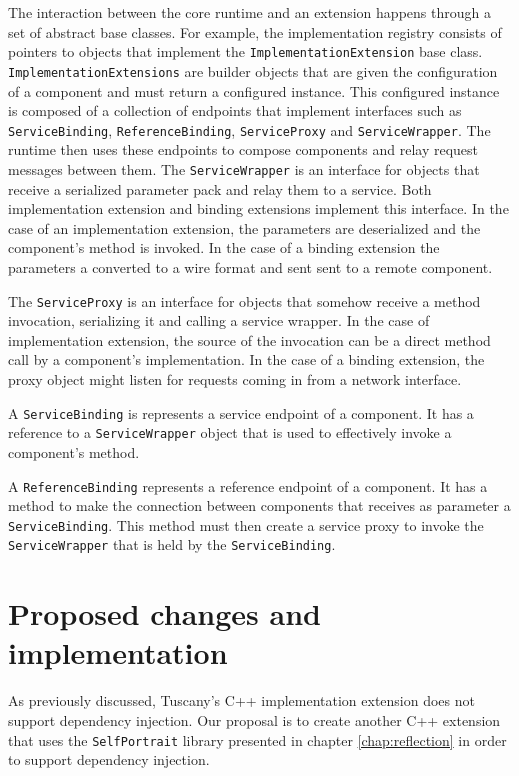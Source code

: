 The interaction between the core runtime and an extension happens through a set of abstract base classes. For example, the
implementation registry consists of pointers to objects that implement the \texttt{ImplementationExtension} base class.
\texttt{ImplementationExtensions} are builder objects that are given the configuration of a component and must return a
configured instance. This configured instance is composed of a collection of endpoints that implement interfaces such as
\texttt{ServiceBinding}, \texttt{ReferenceBinding}, \texttt{ServiceProxy} and \texttt{ServiceWrapper}. The runtime
then uses these endpoints to compose components and relay request messages between them.
The \texttt{ServiceWrapper} is an interface for objects that receive a serialized parameter pack and relay them
to a service. Both implementation extension and binding extensions implement this interface. In the case of an
implementation extension, the parameters are deserialized and the component's method is invoked. In the case
of a binding extension the parameters a converted to a wire format and sent sent to a remote component. 

The \texttt{ServiceProxy} is an interface for objects that somehow receive a method invocation, serializing it and
calling a service wrapper. In the case of implementation extension, the source of the invocation can be a direct method
call by a component's implementation. In the case of a binding extension, the proxy object might listen for requests coming
in from a network interface.

A \texttt{ServiceBinding} is represents a service endpoint of a component. It has a reference to a \texttt{ServiceWrapper}
object that is used to effectively invoke a component's method.

A \texttt{ReferenceBinding} represents a reference endpoint of a component. It has a method to make the connection
between components that receives as parameter a \texttt{ServiceBinding}. This method must then create a service proxy
to invoke the \texttt{ServiceWrapper} that is held by the \texttt{ServiceBinding}.

\section{Proposed changes and implementation}

As previously discussed, Tuscany's C++ implementation extension does not support dependency injection. Our proposal is to
create another C++ extension that uses the \texttt{SelfPortrait} library presented in chapter \ref{chap:reflection} in order
to support dependency injection. 

